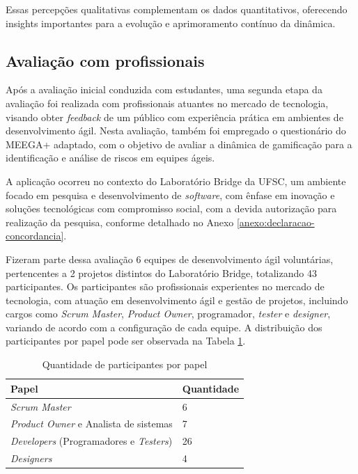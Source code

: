 \documentclass[
	12pt,
	openright,
	twoside,
	a4paper,
	english,
	brazil
	]{abntex2}
\begin{document}
Essas percepções qualitativas complementam os dados quantitativos, oferecendo insights importantes para a evolução e aprimoramento contínuo da dinâmica.

\subsection{Avaliação com profissionais}

Após a avaliação inicial conduzida com estudantes, uma segunda etapa da avaliação foi realizada com profissionais atuantes no mercado de tecnologia, visando obter \textit{feedback} de um público com experiência prática em ambientes de desenvolvimento ágil. Nesta avaliação, também foi empregado o questionário do MEEGA+ adaptado, com o objetivo de avaliar a dinâmica de gamificação para a identificação e análise de riscos em equipes ágeis.

A aplicação ocorreu no contexto do Laboratório Bridge da UFSC, um ambiente focado em pesquisa e desenvolvimento de \textit{software}, com ênfase em inovação e soluções tecnológicas com compromisso social, com a devida autorização para realização da pesquisa, conforme detalhado no Anexo \ref{anexo:declaracao-concordancia}.

Fizeram parte dessa avaliação 6 equipes de desenvolvimento ágil voluntárias, pertencentes a 2 projetos distintos do Laboratório Bridge, totalizando 43 participantes. Os participantes são profissionais experientes no mercado de tecnologia, com atuação em desenvolvimento ágil e gestão de projetos, incluindo cargos como \textit{Scrum Master}, \textit{Product Owner}, programador, \textit{tester} e \textit{designer}, variando de acordo com a configuração de cada equipe. A distribuição dos participantes por papel pode ser observada na Tabela \ref{tab:participantes-papel}.

\begin{table}[H]
  \centering
  \caption{\label{tab:participantes-papel} Quantidade de participantes por papel}
  \begin{tabular}{|p{7cm}|p{2.5cm}|}
    \hline
    \textbf{Papel} & \textbf{Quantidade} \\
    \hline
    \textit{Scrum Master} & 6 \\
    \hline
    \textit{Product Owner} e Analista de sistemas & 7 \\
    \hline
    \textit{Developers} (Programadores e \textit{Testers}) & 26 \\
    \hline
    \textit{Designers} & 4 \\
    \hline
  \end{tabular}
\end{table}
\end{document}
